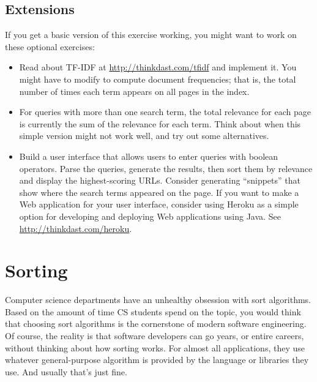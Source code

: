 \documentclass[12pt]{book}
\theoremstyle{exercise}
\begin{document}
\section{Extensions}
\label{extensions}


If you get a basic version of this exercise working, you might want to work
on these optional exercises:

\begin{itemize}

\item Read about TF-IDF at \url{http://thinkdast.com/tfidf}
  and implement it. You might have to modify  to
  compute document frequencies; that is, the total number of times
  each term appears on all pages in the index.

\item For queries with more than one search term, the total relevance for
  each page is currently the sum of the relevance for each term. Think
  about when this simple version might not work well, and try out some
  alternatives.

\item Build a user interface that allows users to enter queries with
  boolean operators. Parse the queries, generate the results, then
  sort them by relevance and display the highest-scoring
  URLs. Consider generating ``snippets'' that show where the search
  terms appeared on the page. If you want to make a Web application
  for your user interface, consider using Heroku as a simple option
  for developing and deploying Web applications using Java.  See
  \url{http://thinkdast.com/heroku}.

\end{itemize}



\chapter{Sorting}

Computer science departments have an unhealthy obsession with sort
algorithms. Based on the amount of time CS students spend on the topic,
you would think that choosing sort algorithms is the cornerstone of
modern software engineering. Of course, the reality is that software
developers can go years, or entire careers, without thinking about how
sorting works. For almost all applications, they use whatever
general-purpose algorithm is provided by the language or libraries they
use. And usually that's just fine.
\end{document}

